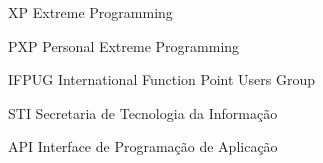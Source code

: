 \begin{siglas}
  \item[XP] Extreme Programming
  \item[PXP] Personal Extreme Programming
  \item[IFPUG] International Function Point Users Group
  \item[STI] Secretaria de Tecnologia da Informação
  \item[API] Interface de Programação de Aplicação
\end{siglas}
